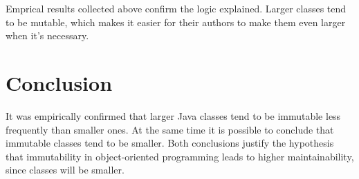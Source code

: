 \documentclass[3p,times,procedia]{elsarticle}
\begin{document}
Emprical results collected above confirm the logic explained. Larger classes
tend to be mutable, which makes it easier for their authors to make them
even larger when it's necessary.

\section{Conclusion}
\label{sec:conclusion}

It was empirically confirmed that larger Java classes tend to be immutable
less frequently than smaller ones. At the same time it is possible to conclude
that immutable classes tend to be smaller. Both conclusions justify
the hypothesis that immutability in object-oriented programming leads
to higher maintainability, since classes will be smaller.




\end{document}
